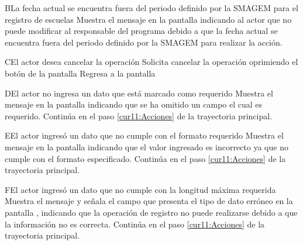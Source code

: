  \begin{UCtrayectoriaA}{B}{La fecha actual se encuentra fuera del periodo definido por la SMAGEM para el registro de escuelas}
    \UCpaso[\UCsist] Muestra el mensaje  en la pantalla  indicando al actor que no puede modificar al responsable del programa debido a que la fecha actual se encuentra fuera del periodo definido por la SMAGEM para realizar la acción.
 \end{UCtrayectoriaA} 
 
 \begin{UCtrayectoriaA}{C}{El actor desea cancelar la operación}
    \UCpaso[\UCactor] Solicita cancelar la operación oprimiendo el botón   de la pantalla 
    \UCpaso[\UCsist] Regresa a la pantalla 
	
 \end{UCtrayectoriaA}
 
 \begin{UCtrayectoriaA}{D}{El actor no ingresa un dato que está marcado como requerido}
    \UCpaso[\UCsist] Muestra el mensaje  en la pantalla  indicando que se ha omitido un campo el cual es requerido. 
	    \UCpaso Continúa en el paso \ref{cur11:Acciones} de la trayectoria principal.
 \end{UCtrayectoriaA}
 
  \begin{UCtrayectoriaA}{E}{El actor ingresó un dato que no cumple con el formato requerido}
    \UCpaso[\UCsist] Muestra el mensaje  en la pantalla  indicando que el valor ingresado es incorrecto ya que no cumple con el formato especificado.
    \UCpaso Continúa en el paso \ref{cur11:Acciones} de la trayectoria principal.
 \end{UCtrayectoriaA}
 
 
 \begin{UCtrayectoriaA}{F}{El actor ingresó un dato que no cumple con la longitud máxima requerida}
    \UCpaso[\UCsist] Muestra el mensaje  y señala el campo que presenta el tipo de dato erróneo en la pantalla , indicando que la operación de registro no puede realizarse debido a que la información no es correcta. 
    \UCpaso Continúa en el paso \ref{cur11:Acciones} de la trayectoria principal.
 \end{UCtrayectoriaA}


